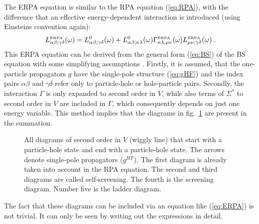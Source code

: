 The ERPA equation is similar to the RPA equation (\ref{eq:RPA}), 
with the difference that
an effective energy-dependent interaction is introduced
(using Einsteins convention again):
%
	\begin{equation}
		L^{\mbox{\tiny ERPA}}_{\alpha\beta;\gamma\delta}(\omega)
	=
		L^0_{\alpha\beta;\gamma\delta}(\omega)
		+%
		L^0_{\alpha\beta;\kappa\lambda}(\omega)
		\Gamma^{\mbox{\tiny ERPA}}_{\kappa\lambda;\mu\nu}(\omega)
		L^{\mbox{\tiny ERPA}}_{\mu\nu;\gamma\delta}(\omega)
	\label{eq:ERPA}
	\;.
	\end{equation}
%
This ERPA equation can be derived from the general form (\ref{eq:BS}) of the BS
equation with some simplifying assumptions \cite{BAD90}. 
Firstly, it is assumed, 
that the one-particle propagators $g$ have the single-pole structure 
(\ref{eq:gHF}) and the index pairs $\alpha\beta$ and $\gamma\delta$ refer 
only to particle-hole or hole-particle pairs. 
Secondly, the interaction $\Gamma$ is only expanded to second order in $V$, 
while also terms of $\Sigma^\ast$ to second order in $V$ are included in 
$\Gamma$, which consequently depends on just one energy variable. 
This method implies that the diagrams in fig.~\ref{fig:ERPAdiagrams}
are present in the summation.
%
%
\begin{figure}
\centerline{
\hspace{25pt}
\hspace{25pt}
\hspace{25pt}
\hspace{25pt}
}
\caption[]{All diagrams of second order in $V$ (wiggly line) that start
with a particle-hole state and end with a particle-hole state. The arrows
denote single-pole propagators ($g^{HF}$). The first diagram is already
taken into account in the RPA equation. The second and third diagrams
are called%
\cite{BAD90} self-screening. The fourth is the screening diagram. Number
five is the ladder diagram.
\label{fig:ERPAdiagrams}}
\end{figure}
The fact that these diagrams
can be included via an equation like (\ref{eq:ERPA}) is not trivial. 
It can only be seen by writing out the expressions in detail.


